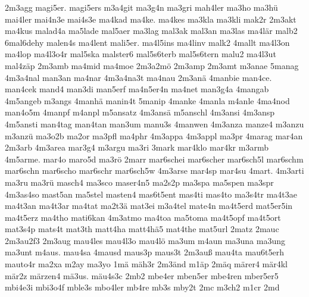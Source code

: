 {    2m3agg
    magi5er.
    magi5ers
    m3a4git
    ma3g4n
    ma3gri
    mah4ler
    ma3ho
    ma3hü
    mai4ler
    mai4n3e
    mai4s3e
    ma4kad
    ma4ke.
    ma4kes
    ma3kla
    ma3kli
    mak2r
    2m3akt
    ma4kus
    malad4a
    ma5lade
    mal5aer
    ma3lag
    mal3ak
    mal3an
    ma3las
    ma4lär
    malb2
    6mal6dehy
    malen4s
    ma4lent
    mali5er.
    ma4l5ins
    ma4linv
    malk2
    4mallt
    ma4l3on
    ma4lop
    ma4l3o4r
    mal5ska
    malster6
    mal5s6terb
    mal5s6tern
    malu2
    ma4l3ut
    mal4zäp
    2m3amb
    ma4mid
    ma4moe
    2m3a2mö
    2m3amp
    2m3amt
    m3anae
    5manag
    4m3a4nal
    man3an
    ma4nar
    4m3a4na3t
    ma4nau
    2m3anä
    4manbie
    man4ce.
    man4cek
    mand4
    man3di
    man5erf
    ma4n5er4n
    ma4net
    man3g4a
    4mangab
    4m5angeb
    m3angs
    4manhä
    manin4t
    5manip
    4manke
    4manla
    m4anle
    4ma4nod
    man4o5m
    4manpf
    m4anpl
    m5ansatz
    4m3ansä
    m5anschl
    4m3ansi
    4m3ansp
    4m5ansti
    man4tag
    man4tan
    man3um
    manu3s
    4manwen
    4m3anza
    manze4
    m3anzu
    m3anzü
    ma3o2b
    ma2or
    ma3pfl
    ma4phr
    4m3appa
    4m3appl
    ma3pr
    4marag
    mar4an
    2m3arb
    4m3area
    mar3g4
    m3argu
    ma3ri
    3mark
    mar4klo
    mar4kr
    m3armb
    4m5arme.
    mar4o
    maro5d
    ma3rö
    2marr
    mar6schei
    mar6scher
    mar6sch5l
    mar6schm
    mar6schn
    mar6scho
    mar6schr
    mar6sch5w
    4m3arse
    mar4sp
    mar4su
    4mart.
    4m3arti
    ma3ru
    ma3rü
    masch4
    ma3sco
    maser4n5
    ma2s2p
    ma3spa
    ma5spen
    ma3spr
    4m3as4so
    mast5an
    ma5stel
    masten4
    mas6t5ent
    mas4ti
    mas4to
    ma3s4tr
    ma4t3ae
    ma4t3an
    ma4t3ar
    ma4tat
    ma2t3ä
    mat3ei
    m3a4tel
    mate4n
    ma4t5erd
    mat5er5in
    ma4t5erz
    ma4tho
    mati6kan
    4m3atmo
    ma4toa
    ma5toma
    ma4t5opf
    ma4t5ort
    mat3s4p
    mats4t
    mat3th
    matt4ha
    matt4hä5
    mat4the
    mat5url
    2matz
    2mauc
    2m3au2f3
    2m3aug
    mau4les
    mau4l3o
    mau4lö
    ma3um
    m4aun
    ma3una
    ma3ung
    ma3unt
    m4aus.
    mau4sa
    4mausd
    maus3p
    maus3t
    2m3auß
    mau4ta
    mau6t5erh
    mauto4r
    ma2xa
    m2ay
    ma3yo
    1mä
    mäh3r
    2m3änd
    m1äp
    2mäq
    märer4
    mär4kl
    mär2z
    märzen4
    mä3us.
    mäu4s3c
    2mb2
    mbe4er
    mben5er
    mbe4ren
    mber5er5
    mbi4e3i
    mbi3o4f
    mble3s
    mbo4ler
    mb4re
    mb3s
    mby2t
    2mc
    m3ch2
    m1cr
    2md
}

